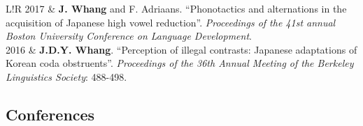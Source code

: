 \documentclass[a4paper,11pt]{article}
\newcommand\VRule{\color{lightgray}\vrule width 0.5pt}
\begin{document}
\begin{longtable}{L!{\VRule}R}
		2017 & \textbf{J. Whang} and F. Adriaans. ``Phonotactics and alternations in the acquisition of Japanese high vowel reduction''. \emph{Proceedings of the 41st annual Boston University Conference on Language Development}.\\

		2016 & \textbf{J.D.Y. Whang}. ``Perception of illegal contrasts: Japanese adaptations of Korean coda obstruents''. \emph{Proceedings of the 36th Annual Meeting of the Berkeley Linguistics Society}: 488-498.\\

		
				
		
					\end{longtable}
	
	\subsection*{Conferences}
\end{document}
